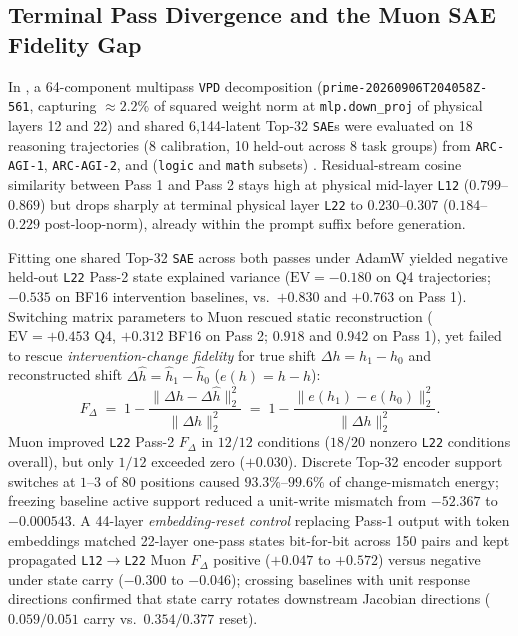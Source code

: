 \documentclass[10pt,letterpaper]{article}
\begin{document}
\subsection{Terminal Pass Divergence and the Muon SAE Fidelity Gap}

In \cite{dugan2026vpd}, a 64-component multipass \texttt{VPD} decomposition (\texttt{prime-20260906T204058Z-561}, capturing $\approx 2.2\%$ of squared weight norm at \texttt{mlp.down\_proj} of physical layers 12 and 22) and shared 6,144-latent Top-32 \texttt{SAE}s were evaluated on 18 reasoning trajectories (8 calibration, 10 held-out across 8 task groups) from \texttt{ARC-AGI-1}, \texttt{ARC-AGI-2}, and  (\texttt{logic} and \texttt{math} subsets) \cite{primeintellect2025intellect3}. Residual-stream cosine similarity between Pass 1 and Pass 2 stays high at physical mid-layer \texttt{L12} ($0.799$--$0.869$) but drops sharply at terminal physical layer \texttt{L22} to $0.230$--$0.307$ ($0.184$--$0.229$ post-loop-norm), already within the prompt suffix before generation.

Fitting one shared Top-32 \texttt{SAE} across both passes under AdamW yielded negative held-out \texttt{L22} Pass-2 state explained variance ($\mathrm{EV} = -0.180$ on Q4 trajectories; $-0.535$ on BF16 intervention baselines, vs.\ $+0.830$ and $+0.763$ on Pass 1). Switching matrix parameters to Muon \cite{jordan2024muon,dugan2026muonsae} rescued static reconstruction ($\mathrm{EV} = +0.453$ Q4, $+0.312$ BF16 on Pass 2; $0.918$ and $0.942$ on Pass 1), yet failed to rescue \emph{intervention-change fidelity} for true shift $\Delta h = h_1 - h_0$ and reconstructed shift $\Delta \hat{h} = \hat{h}_1 - \hat{h}_0$ ($e(h)=h-\hat{h}$):
\begin{equation}
  F_\Delta \;=\; 1 - \frac{\|\Delta h - \Delta \hat{h}\|_2^2}{\|\Delta h\|_2^2}
  \;=\; 1 - \frac{\|e(h_1) - e(h_0)\|_2^2}{\|\Delta h\|_2^2}.
  \label{eq:fdelta}
\end{equation}
Muon improved \texttt{L22} Pass-2 $F_\Delta$ in $12/12$ conditions ($18/20$ nonzero \texttt{L22} conditions overall), but only $1/12$ exceeded zero ($+0.030$). Discrete Top-32 encoder support switches at $1$--$3$ of $80$ positions caused $93.3\%$--$99.6\%$ of change-mismatch energy; freezing baseline active support reduced a unit-write mismatch from $-52.367$ to $-0.000543$. A 44-layer \emph{embedding-reset control} replacing Pass-1 output with token embeddings matched 22-layer one-pass states bit-for-bit across 150 pairs and kept propagated \texttt{L12}$\to$\texttt{L22} Muon $F_\Delta$ positive ($+0.047$ to $+0.572$) versus negative under state carry ($-0.300$ to $-0.046$); crossing baselines with unit response directions confirmed that state carry rotates downstream Jacobian directions ($0.059/0.051$ carry vs.\ $0.354/0.377$ reset).
\end{document}
